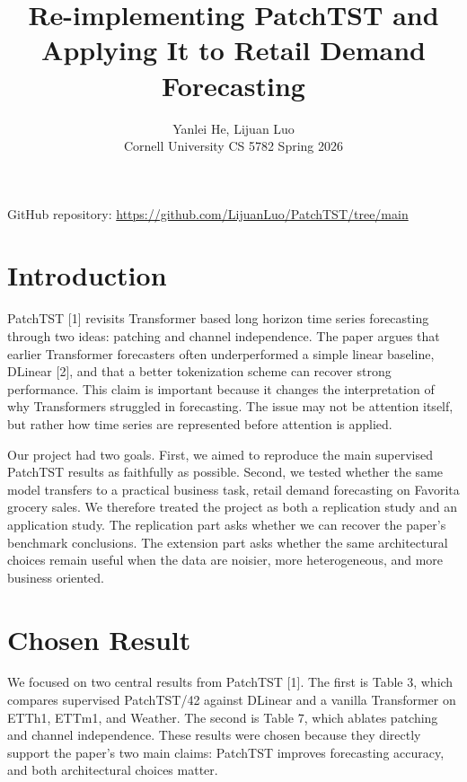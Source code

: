 \documentclass[11pt]{article}
\title{\vspace{-2em}\textbf{Re-implementing PatchTST and Applying It to Retail Demand Forecasting}}
\author{\small Yanlei He, Lijuan Luo \\ \small Cornell University \quad CS 5782 \quad Spring 2026}
\date{\vspace{-1.5em}}
\begin{document}
\maketitle
\vspace{-1.1em}
\begin{center}
\small GitHub repository: \url{https://github.com/LijuanLuo/PatchTST/tree/main}
\end{center}
\vspace{-0.6em}

\section{Introduction}

PatchTST [1] revisits Transformer based long horizon time series forecasting through two ideas: patching and channel independence. The paper argues that earlier Transformer forecasters often underperformed a simple linear baseline, DLinear [2], and that a better tokenization scheme can recover strong performance. This claim is important because it changes the interpretation of why Transformers struggled in forecasting. The issue may not be attention itself, but rather how time series are represented before attention is applied.

Our project had two goals. First, we aimed to reproduce the main supervised PatchTST results as faithfully as possible. Second, we tested whether the same model transfers to a practical business task, retail demand forecasting on Favorita grocery sales. We therefore treated the project as both a replication study and an application study. The replication part asks whether we can recover the paper's benchmark conclusions. The extension part asks whether the same architectural choices remain useful when the data are noisier, more heterogeneous, and more business oriented.

\section{Chosen Result}

We focused on two central results from PatchTST [1]. The first is Table 3, which compares supervised PatchTST/42 against DLinear and a vanilla Transformer on ETTh1, ETTm1, and Weather. The second is Table 7, which ablates patching and channel independence. These results were chosen because they directly support the paper's two main claims: PatchTST improves forecasting accuracy, and both architectural choices matter.
\end{document}

